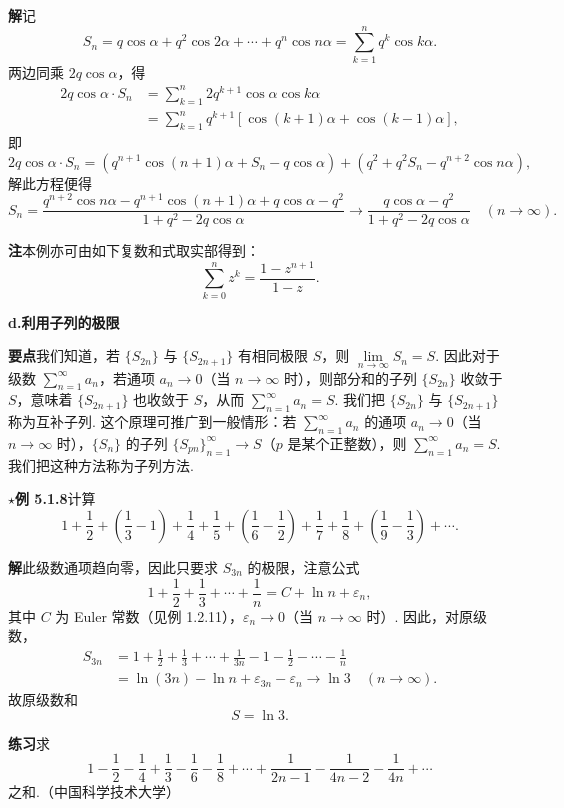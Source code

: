 \documentclass[UTF8,12pt,a4paper,fontset=fandol]{ctexart}
\begin{document}
\noindent\textbf{解}\quad 记
\[
  S_n=q\cos\alpha+q^2\cos2\alpha+\cdots+q^n\cos n\alpha
  =\sum_{k=1}^n q^k\cos k\alpha.
\]
两边同乘 $2q\cos\alpha$，得
\[
\begin{aligned}
2q\cos\alpha\cdot S_n
&=\sum_{k=1}^n 2q^{k+1}\cos\alpha\cos k\alpha\\
&=\sum_{k=1}^n q^{k+1}[\cos(k+1)\alpha+\cos(k-1)\alpha],
\end{aligned}
\]
即
\[
  2q\cos\alpha\cdot S_n
  =\left(q^{n+1}\cos(n+1)\alpha+S_n-q\cos\alpha\right)
   +\left(q^2+q^2S_n-q^{n+2}\cos n\alpha\right),
\]
解此方程便得
\[
  S_n=\frac{q^{n+2}\cos n\alpha-q^{n+1}\cos(n+1)\alpha+q\cos\alpha-q^2}
  {1+q^2-2q\cos\alpha}
  \to \frac{q\cos\alpha-q^2}{1+q^2-2q\cos\alpha}\quad(n\to\infty).
\]

\noindent\textbf{注}\quad 本例亦可由如下复数和式取实部得到：
\[
  \sum_{k=0}^n z^k=\frac{1-z^{n+1}}{1-z}.
\]

\noindent\textbf{d.\quad 利用子列的极限}

\noindent\textbf{要点}\quad 我们知道，若 $\{S_{2n}\}$ 与 $\{S_{2n+1}\}$ 有相同极限 $S$，则 $\lim\limits_{n\to\infty}S_n=S$. 因此对于级数 $\displaystyle\sum_{n=1}^\infty a_n$，若通项 $a_n\to0$（当 $n\to\infty$ 时），则部分和的子列 $\{S_{2n}\}$ 收敛于 $S$，意味着 $\{S_{2n+1}\}$ 也收敛于 $S$，从而 $\displaystyle\sum_{n=1}^\infty a_n=S$. 我们把 $\{S_{2n}\}$ 与 $\{S_{2n+1}\}$ 称为互补子列. 这个原理可推广到一般情形：若 $\displaystyle\sum_{n=1}^\infty a_n$ 的通项 $a_n\to0$（当 $n\to\infty$ 时），$\{S_n\}$ 的子列 $\{S_{pn}\}_{n=1}^\infty\to S$（$p$ 是某个正整数），则 $\displaystyle\sum_{n=1}^\infty a_n=S$. 我们把这种方法称为子列方法.

\noindent\textbf{$\star$例 5.1.8}\quad 计算
\[
  1+\frac12+\left(\frac13-1\right)+\frac14+\frac15+\left(\frac16-\frac12\right)
  +\frac17+\frac18+\left(\frac19-\frac13\right)+\cdots.
\]

\noindent\textbf{解}\quad 此级数通项趋向零，因此只要求 $S_{3n}$ 的极限，注意公式
\[
  1+\frac12+\frac13+\cdots+\frac1n=C+\ln n+\varepsilon_n,
\]
其中 $C$ 为 Euler 常数（见例 1.2.11），$\varepsilon_n\to0$（当 $n\to\infty$ 时）. 因此，对原级数，
\[
\begin{aligned}
S_{3n}
&=1+\frac12+\frac13+\cdots+\frac1{3n}-1-\frac12-\cdots-\frac1n\\
&=\ln(3n)-\ln n+\varepsilon_{3n}-\varepsilon_n\to\ln3\quad(n\to\infty).
\end{aligned}
\]
故原级数和
\[
  S=\ln3.
\]

\noindent\textbf{练习}\quad 求
\[
  1-\frac12-\frac14+\frac13-\frac16-\frac18+\cdots+\frac1{2n-1}
  -\frac1{4n-2}-\frac1{4n}+\cdots
\]
之和.（中国科学技术大学）
\end{document}
